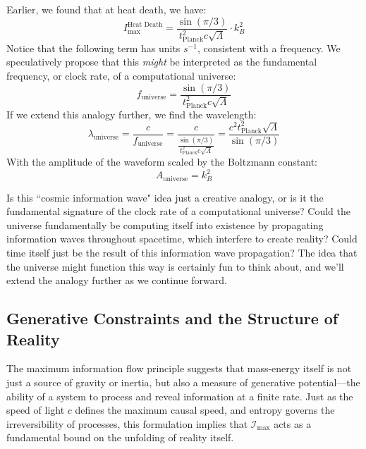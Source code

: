 \documentclass[12pt]{article}
\begin{document}
Earlier, we found that at heat death, we have:
\begin{equation}
    I_\text{max}^{\text{Heat Death}} = \frac{\sin(\pi / 3)}{t_\text{Planck}^2 c \sqrt{\Lambda}} \cdot k_B^2
\end{equation}
Notice that the following term has units $s^{-1}$, consistent with a frequency. We speculatively propose that this \textit{might} be interpreted as the fundamental frequency, or clock rate, of a computational universe:
\begin{equation}
    f_\text{universe} = \frac{\sin(\pi / 3)}{t_\text{Planck}^2 c \sqrt{\Lambda}} 
\end{equation}
If we extend this analogy further, we find the wavelength:
\begin{equation}
    \lambda_\text{universe} = \frac{c}{f_\text{universe}} = \frac{c}{\frac{\sin(\pi / 3)}{t_\text{Planck}^2 c \sqrt{\Lambda}}} = \frac{c^2 t_\text{Planck}^2 \sqrt{\Lambda}}{\sin(\pi / 3)}
\end{equation}
With the amplitude of the waveform scaled by the Boltzmann constant:
\begin{equation}
    A_\text{universe} = k_B^2
\end{equation}

Is this ``cosmic information wave" idea just a creative analogy, or is it the fundamental signature of the clock rate of a computational universe? Could the universe fundamentally be computing itself into existence by propagating information waves throughout spacetime, which interfere to create reality? Could time itself just be the result of this information wave propagation? The idea that the universe might function this way is certainly fun to think about, and we'll extend the analogy further as we continue forward.

\subsection{Generative Constraints and the Structure of Reality}

The maximum information flow principle suggests that mass-energy itself is not just a source of gravity or inertia, but also a measure of generative potential—the ability of a system to process and reveal information at a finite rate. Just as the speed of light \( c \) defines the maximum causal speed, and entropy governs the irreversibility of processes, this formulation implies that \( \mathcal{I}_{\text{max}} \) acts as a fundamental bound on the unfolding of reality itself.
\end{document}
